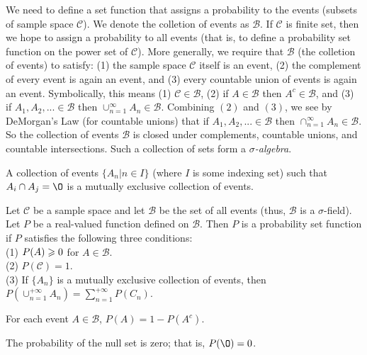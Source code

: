 We need to define a set function that assigns a probability to the events (subsets of sample space $\mathcal{C}$).
We denote the colletion of events as $\mathcal{B}$.
If $\mathcal{C}$ is finite set, then we hope to assign a 
probability to all events (that is, to define a probability set function on the power set of $\mathcal{C}$).
More generally, we require that $\mathcal{B}$ (the colletion of events) to satisfy:
(1) the sample space $\mathcal{C}$ itself is an event,
(2) the complement of every event is again an event, and
(3) every countable union of events is again an event.
Symbolically, this means 
(1) $\mathcal{C}\in\mathcal{B}$,
(2) if $A\in\mathcal{B}$ then $A^c\in \mathcal{B}$, and
(3) if $A_1,A_2,...\in \mathcal{B}$ then $\cup_{n=1}^{\infty} A_n\in \mathcal{B}$.
Combining $(2)$ and $(3)$, we see by DeMorgan's Law (for countable unions)
that if $A_1,A_2,...\in\mathcal{B}$ then $\cap_{n=1}^{\infty}A_n\in \mathcal{B}$.
So the collection of events $\mathcal{B}$ is closed under complements, countable unions, 
and countable intersections.
Such a collection of sets form a \textit{$\sigma$-algebra}.


\begin{definition}{}{}
    A collection of events $\{A_n|n\in I\}$ (where $I$ is some indexing set)
    such that $A_i\cap A_j=\O$ is a mutually exclusive collection of events.
\end{definition}


\begin{definition}{}{}
    Let $\mathcal{C}$ be a sample space and let $\mathcal{B}$ be the set of all events (thus, $\mathcal{B}$ is a $\sigma$-field).
    Let $P$ be a real-valued function defined on $\mathcal{B}$.
    Then $P$ is a probability set function if $P$ satisfies the following three conditions:\\
    (1) $P(A)\geqslant 0$ for $A\in \mathcal{B}$.\\
    (2) $P(\mathcal{C})=1$.\\
    (3) If $\{A_n\}$ is a mutually exclusive collection of events, then $P(\cup_{n=1}^{+\infty}A_n)=\sum\limits_{n=1}^{+\infty}P(C_n)$.
\end{definition}

\begin{theorem}{}{}
    For each event $A\in\mathcal{B}$, $P(A)=1-P(A^c)$.
\end{theorem}

\begin{theorem}{}{}
    The probability of the null set is zero; that is, $P(\O)=0$.
\end{theorem}

